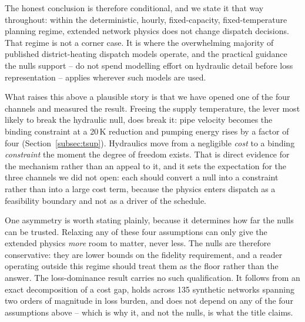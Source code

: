 The honest conclusion is therefore conditional, and we state it that way throughout: within
the deterministic, hourly, fixed-capacity, fixed-temperature planning regime, extended
network physics does not change dispatch decisions. That regime is not a corner case. It is
where the overwhelming majority of published district-heating dispatch models operate, and
the practical guidance the nulls support -- do not spend modelling effort on hydraulic
detail before loss representation -- applies wherever such models are used.

What raises this above a plausible story is that we have opened one of the four channels
and measured the result. Freeing the supply temperature, the lever most likely to break the
hydraulic null, does break it: pipe velocity becomes the binding constraint at a 20\,K
reduction and pumping energy rises by a factor of four
(Section~\ref{subsec:tsup}). Hydraulics move from a negligible \emph{cost} to a binding
\emph{constraint} the moment the degree of freedom exists. That is direct evidence for the
mechanism rather than an appeal to it, and it sets the expectation for the three channels
we did not open: each should convert a null into a constraint rather than into a large cost
term, because the physics enters dispatch as a feasibility boundary and not as a driver of
the schedule.

One asymmetry is worth stating plainly, because it determines how far the nulls can be
trusted. Relaxing any of these four assumptions can only give the extended physics
\emph{more} room to matter, never less. The nulls are therefore conservative: they are
lower bounds on the fidelity requirement, and a reader operating outside this regime should
treat them as the floor rather than the answer. The loss-dominance result carries no such
qualification. It follows from an exact decomposition of a cost gap, holds across 135
synthetic networks spanning two orders of magnitude in loss burden, and does not depend on
any of the four assumptions above -- which is why it, and not the nulls, is what the title
claims.
